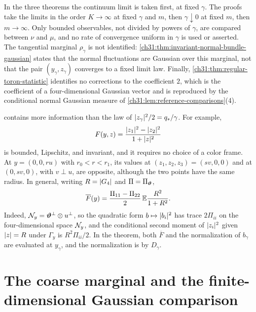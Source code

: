 \begin{remark}\label{ch31:rem:scope}
In the three theorems the continuum limit is taken first, at fixed $\gamma$. The proofs take the limits in the order $K\to\infty$ at fixed $\gamma$ and $m$, then $\gamma\downarrow0$ at fixed $m$, then $m\to\infty$. Only bounded observables, not divided by powers of $\gamma$, are compared between $\nu$ and $\mu$, and no rate of convergence uniform in $\gamma$ is used or asserted. The tangential marginal $\rho_\gamma$ is not identified: \cref{ch31:thm:invariant-normal-bundle-gaussian} states that the normal fluctuations are Gaussian over this marginal, not that the pair $(y_\gamma,z_\gamma)$ converges to a fixed limit law. Finally, \cref{ch31:thm:regular-toron-statistic} identifies no corrections to the coefficient $2$, which is the coefficient of a four-dimensional Gaussian vector and is reproduced by the conditional normal Gaussian measure of \cref{ch31:lem:reference-comparisons}(4).
\end{remark}

\begin{remark}\label{ch31:rem:nonradial}
 contains more information than the law of $\lvert z_\gamma\rvert^2/2=q_*/\gamma$. For example,
\[
 F(y,z)=\frac{\lvert z_1\rvert^2-\lvert z_2\rvert^2}{1+\lvert z\rvert^2}
\]
is bounded, Lipschitz, and invariant, and it requires no choice of a color frame. At $y=(0,0,ru)$ with $r_0<r<r_1$, its values at $(z_1,z_2,z_3)=(sv,0,0)$ and at $(0,sv,0)$, with $v\perp u$, are opposite, although the two points have the same radius. In general, writing $R=\lvert G_4\rvert$ and $\Pi=\Pi_{\bm\vartheta}$,
\[
 \overline F(y)=\frac{\Pi_{11}-\Pi_{22}}2\,\mathbb E\frac{R^2}{1+R^2}.
\]
Indeed, $\mathcal N_{y}=\bm\vartheta^\perp\otimes u^\perp$, so the quadratic form $b\mapsto\lvert b_i\rvert^2$ has trace $2\Pi_{ii}$ on the four-dimensional space $\mathcal N_{y}$, and the conditional second moment of $\lvert z_i\rvert^2$ given $\lvert z\rvert=R$ under $\Gamma_y$ is $R^2\Pi_{ii}/2$. In the theorem, both $\overline F$ and the normalization of $b_\gamma$ are evaluated at $y_\gamma$, and the normalization is by $D_\gamma$.
\end{remark}

\section{The coarse marginal and the finite-dimensional Gaussian comparison}\label{ch31:sec:gaussian-comparison}


